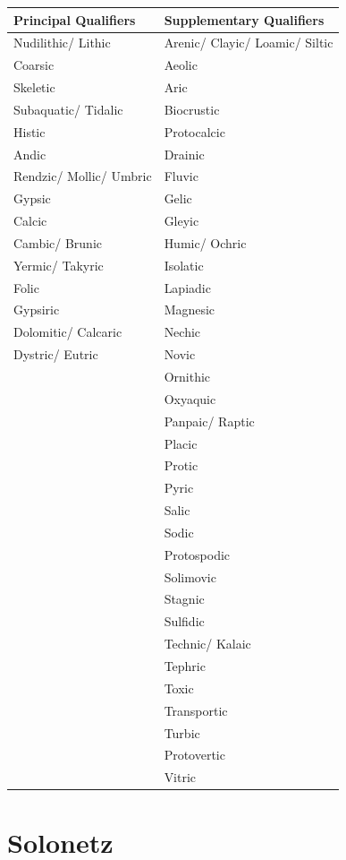 \documentclass[
  letterpaper,
  DIV=11,
  numbers=noendperiod]{scrreprt}
\begin{document}
\begin{longtable}[]{@{}ll@{}}
\toprule()
Principal Qualifiers & Supplementary Qualifiers \\
\midrule()
\endhead
Nudilithic/ Lithic & Arenic/ Clayic/ Loamic/ Siltic \\
Coarsic & Aeolic \\
Skeletic & Aric \\
Subaquatic/ Tidalic & Biocrustic \\
Histic & Protocalcic \\
Andic & Drainic \\
Rendzic/ Mollic/ Umbric & Fluvic \\
Gypsic & Gelic \\
Calcic & Gleyic \\
Cambic/ Brunic & Humic/ Ochric \\
Yermic/ Takyric & Isolatic \\
Folic & Lapiadic \\
Gypsiric & Magnesic \\
Dolomitic/ Calcaric & Nechic \\
Dystric/ Eutric & Novic \\
& Ornithic \\
& Oxyaquic \\
& Panpaic/ Raptic \\
& Placic \\
& Protic \\
& Pyric \\
& Salic \\
& Sodic \\
& Protospodic \\
& Solimovic \\
& Stagnic \\
& Sulfidic \\
& Technic/ Kalaic \\
& Tephric \\
& Toxic \\
& Transportic \\
& Turbic \\
& Protovertic \\
& Vitric \\
\bottomrule()
\end{longtable}


\hypertarget{key-solonetz}{%
\chapter{Solonetz}\label{key-solonetz}}
\end{document}
